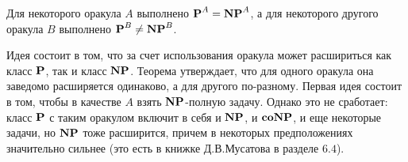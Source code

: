 \begin{theorem}
Для некоторого оракула $A$ выполнено $\textbf{P}^A = \textbf{NP}^A$, а для некоторого другого оракула $B$ выполнено $\textbf{P}^B \not= \textbf{NP}^B$.
\end{theorem}

 Идея состоит в том, что за счет использования оракула может расшириться как класс $\textbf{P}$, так и класс $\textbf{NP}$. Теорема утверждает, что для одного оракула она заведомо расширяется одинаково, а для другого по-разному. Первая идея состоит в том, чтобы в качестве $A$ взять $\textbf{NP}$-полную задачу. Однако это не сработает: класс $\textbf{P}$ с таким оракулом включит в себя и $\textbf{NP}$, и $\textbf{coNP}$, и еще некоторые задачи, но $\textbf{NP}$ тоже расширится, причем в некоторых предположениях значительно сильнее (это есть в книжке Д.В.Мусатова в разделе $6.4$).

